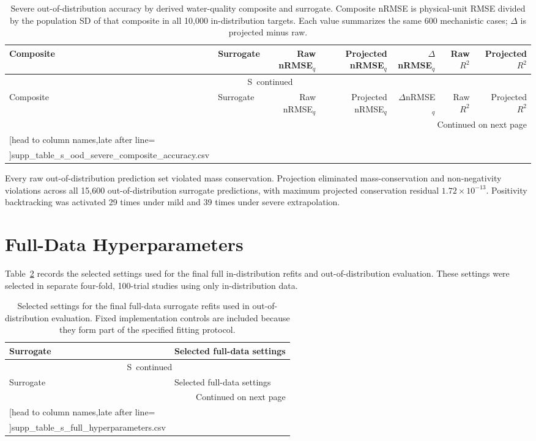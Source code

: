 \documentclass[a4paper,10pt]{article}
\newcommand{\csvrowstwo}[1]{%
  \csvreader[head to column names,late after line=\\]{#1}{}{\colA & \colB}}
\newcommand{\csvrowsseven}[1]{%
  \csvreader[head to column names,late after line=\\]{#1}{}{\colA & \colB & \colC & \colD & \colE & \colF & \colG}}
\newcommand{\csvlongtable}[7]{%
  \begin{longtable}{#1}
  \caption{#2}\label{#3}\\
  \toprule
  #5 \\
  \midrule
  \endfirsthead
  \multicolumn{#4}{c}{\tablename\ \thetable\ continued}\\
  \toprule
  #5 \\
  \midrule
  \endhead
  \midrule\multicolumn{#4}{r}{Continued on next page}\\
  \endfoot
  \bottomrule
  \endlastfoot
  #7{#6}
  \end{longtable}%
}
\renewcommand{\thetable}{S\arabic{table}}
\begin{document}
\clearpage
\begingroup
\scriptsize
\setlength{\tabcolsep}{3pt}
\csvlongtable
  {lp{3.1cm}rrrrr}
  {Severe out-of-distribution accuracy by derived water-quality composite and surrogate. Composite nRMSE is physical-unit RMSE divided by the population SD of that composite in all 10,000 in-distribution targets. Each value summarizes the same 600 mechanistic cases; $\Delta$ is projected minus raw.}
  {tab:s_ood_severe_composite_accuracy}
  {7}
  {Composite & Surrogate & Raw nRMSE$_q$ & Projected nRMSE$_q$ & $\Delta$nRMSE$_q$ & Raw $R^2$ & Projected $R^2$}
  {supp_table_s_ood_severe_composite_accuracy.csv}
  {\csvrowsseven}
\endgroup

Every raw out-of-distribution prediction set violated mass conservation. Projection eliminated mass-conservation and non-negativity violations across all 15,600 out-of-distribution surrogate predictions, with maximum projected conservation residual $1.72\times10^{-13}$. Positivity backtracking was activated 29 times under mild and 39 times under severe extrapolation.

\section{Full-Data Hyperparameters}

Table~\ref{tab:s_full_hyperparameters} records the selected settings used for the final full in-distribution refits and out-of-distribution evaluation. These settings were selected in separate four-fold, 100-trial studies using only in-distribution data.

\begingroup
\scriptsize
\setlength{\tabcolsep}{4pt}
\csvlongtable
  {p{3.2cm}p{11.5cm}}
  {Selected settings for the final full-data surrogate refits used in out-of-distribution evaluation. Fixed implementation controls are included because they form part of the specified fitting protocol.}
  {tab:s_full_hyperparameters}
  {2}
  {Surrogate & Selected full-data settings}
  {supp_table_s_full_hyperparameters.csv}
  {\csvrowstwo}
\endgroup
\end{document}

